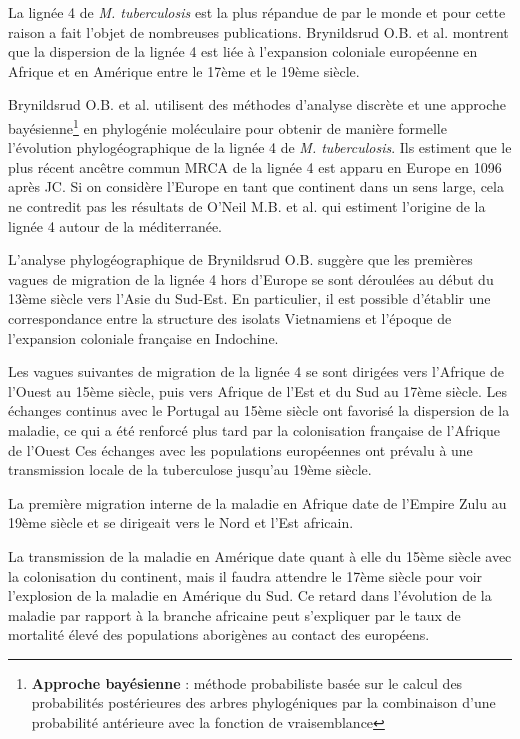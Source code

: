 \documentclass[twoside,a4paper,11pt,frenchb,openany]{report}
\begin{document}
La lignée 4 de \textit{M. tuberculosis} est la plus répandue de par le monde et pour cette raison a fait l'objet de nombreuses publications. Brynildsrud O.B. et al.\cite{brynildsrud} montrent que la dispersion de la lignée 4 est liée à l'expansion coloniale européenne en Afrique et en Amérique entre le 17ème et le 19ème siècle.


Brynildsrud O.B. et al. utilisent des méthodes d'analyse discrète et une approche bayésienne\footnote{\textbf{Approche bayésienne} : méthode probabiliste basée sur le calcul des probabilités postérieures des arbres phylogéniques par la combinaison d'une probabilité antérieure avec la fonction de vraisemblance} en phylogénie moléculaire pour obtenir de manière formelle l'évolution phylogéographique de la lignée 4 de \textit{M. tuberculosis}. Ils estiment que le plus récent ancêtre commun MRCA de la lignée 4 est apparu en Europe en 1096 après JC. Si on considère l'Europe en tant que continent dans un sens large, cela ne contredit pas les résultats de O'Neil M.B. et al.\cite{oneil} qui estiment l'origine de la lignée 4 autour de la méditerranée.


L'analyse phylogéographique de Brynildsrud O.B. suggère que les premières vagues de migration de la lignée 4 hors d'Europe se sont déroulées au début du 13ème siècle vers l'Asie du Sud-Est. En particulier, il est possible d'établir une correspondance entre la structure des isolats Vietnamiens et l'époque de l'expansion coloniale française en Indochine.

Les vagues suivantes de migration de la lignée 4 se sont dirigées vers l'Afrique de l'Ouest au 15ème siècle, puis vers Afrique de l'Est et du Sud au 17ème siècle. Les échanges continus avec le Portugal au 15ème siècle ont favorisé la dispersion de la maladie, ce qui a été renforcé plus tard par la colonisation française de l'Afrique de l'Ouest  Ces échanges avec les populations européennes ont prévalu à une transmission locale de la tuberculose jusqu'au 19ème siècle. 

La première migration interne de la maladie en Afrique date de l'Empire Zulu au 19ème siècle et se dirigeait vers le Nord et l'Est africain.

La transmission de la maladie en Amérique date quant à elle du 15ème siècle avec la colonisation du continent, mais il faudra attendre le 17ème siècle pour voir l'explosion de la maladie en Amérique du Sud. Ce retard dans l'évolution de la maladie par rapport à la branche africaine peut s'expliquer par le taux de mortalité élevé des populations aborigènes au contact des européens.
\end{document}
